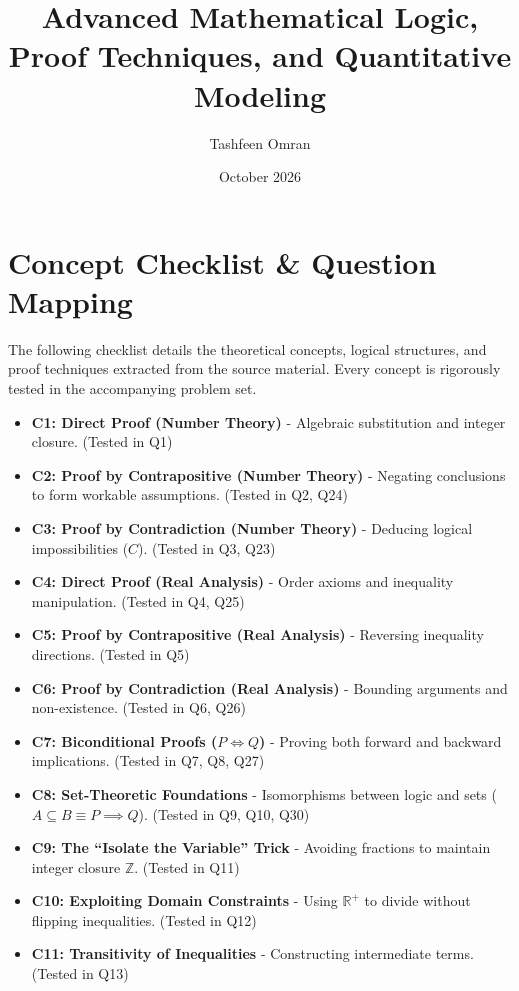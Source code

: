 \documentclass[11pt]{article}
\title{\textbf{Advanced Mathematical Logic, Proof Techniques, and Quantitative Modeling}}
\author{Tashfeen Omran}
\date{October 2026}
\begin{document}
\maketitle

\tableofcontents
\newpage

\section{Concept Checklist \& Question Mapping}
\label{sec:checklist_start}
The following checklist details the theoretical concepts, logical structures, and proof techniques extracted from the source material. Every concept is rigorously tested in the accompanying problem set.

\begin{itemize}
    \item \textbf{C1: Direct Proof (Number Theory)} - Algebraic substitution and integer closure. (Tested in Q1)
    \item \textbf{C2: Proof by Contrapositive (Number Theory)} - Negating conclusions to form workable assumptions. (Tested in Q2, Q24)
    \item \textbf{C3: Proof by Contradiction (Number Theory)} - Deducing logical impossibilities ($C$). (Tested in Q3, Q23)
    \item \textbf{C4: Direct Proof (Real Analysis)} - Order axioms and inequality manipulation. (Tested in Q4, Q25)
    \item \textbf{C5: Proof by Contrapositive (Real Analysis)} - Reversing inequality directions. (Tested in Q5)
    \item \textbf{C6: Proof by Contradiction (Real Analysis)} - Bounding arguments and non-existence. (Tested in Q6, Q26)
    \item \textbf{C7: Biconditional Proofs ($P \iff Q$)} - Proving both forward and backward implications. (Tested in Q7, Q8, Q27)
    \item \textbf{C8: Set-Theoretic Foundations} - Isomorphisms between logic and sets ($A \subseteq B \equiv P \implies Q$). (Tested in Q9, Q10, Q30)
    \item \textbf{C9: The ``Isolate the Variable'' Trick} - Avoiding fractions to maintain integer closure $\mathbb{Z}$. (Tested in Q11)
    \item \textbf{C10: Exploiting Domain Constraints} - Using $\mathbb{R}^+$ to divide without flipping inequalities. (Tested in Q12)
    \item \textbf{C11: Transitivity of Inequalities} - Constructing intermediate terms. (Tested in Q13)

\end{itemize}
\end{document}
